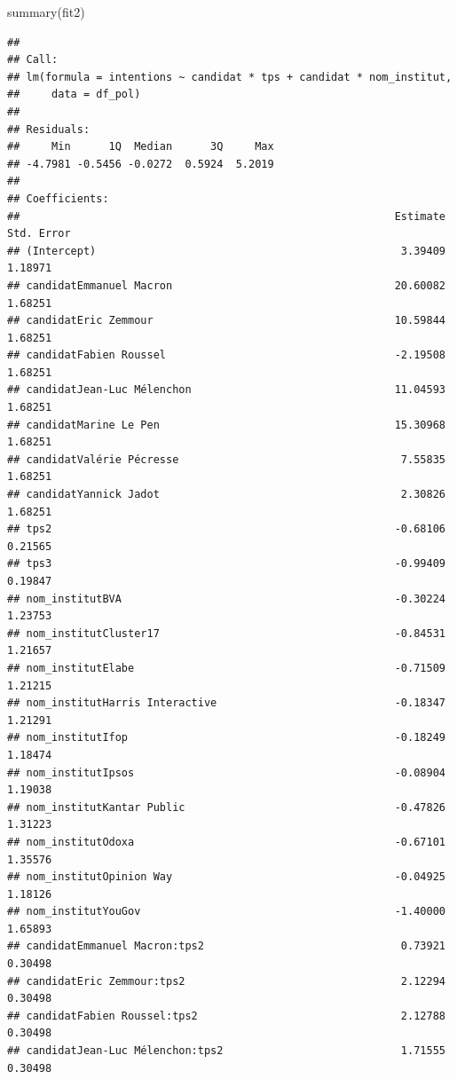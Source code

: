 \documentclass[
]{book}
\newenvironment{Shaded}{\begin{snugshade}}{\end{snugshade}}
\newcommand{\FunctionTok}[1]{\textcolor[rgb]{0.00,0.00,0.00}{#1}}
\newcommand{\NormalTok}[1]{#1}
\begin{document}
\begin{Shaded}
\begin{Highlighting}[]
\FunctionTok{summary}\NormalTok{(fit2)}
\end{Highlighting}
\end{Shaded}

\begin{verbatim}
## 
## Call:
## lm(formula = intentions ~ candidat * tps + candidat * nom_institut, 
##     data = df_pol)
## 
## Residuals:
##     Min      1Q  Median      3Q     Max 
## -4.7981 -0.5456 -0.0272  0.5924  5.2019 
## 
## Coefficients:
##                                                           Estimate Std. Error
## (Intercept)                                                3.39409    1.18971
## candidatEmmanuel Macron                                   20.60082    1.68251
## candidatEric Zemmour                                      10.59844    1.68251
## candidatFabien Roussel                                    -2.19508    1.68251
## candidatJean-Luc Mélenchon                                11.04593    1.68251
## candidatMarine Le Pen                                     15.30968    1.68251
## candidatValérie Pécresse                                   7.55835    1.68251
## candidatYannick Jadot                                      2.30826    1.68251
## tps2                                                      -0.68106    0.21565
## tps3                                                      -0.99409    0.19847
## nom_institutBVA                                           -0.30224    1.23753
## nom_institutCluster17                                     -0.84531    1.21657
## nom_institutElabe                                         -0.71509    1.21215
## nom_institutHarris Interactive                            -0.18347    1.21291
## nom_institutIfop                                          -0.18249    1.18474
## nom_institutIpsos                                         -0.08904    1.19038
## nom_institutKantar Public                                 -0.47826    1.31223
## nom_institutOdoxa                                         -0.67101    1.35576
## nom_institutOpinion Way                                   -0.04925    1.18126
## nom_institutYouGov                                        -1.40000    1.65893
## candidatEmmanuel Macron:tps2                               0.73921    0.30498
## candidatEric Zemmour:tps2                                  2.12294    0.30498
## candidatFabien Roussel:tps2                                2.12788    0.30498
## candidatJean-Luc Mélenchon:tps2                            1.71555    0.30498

\end{verbatim}
\end{document}
